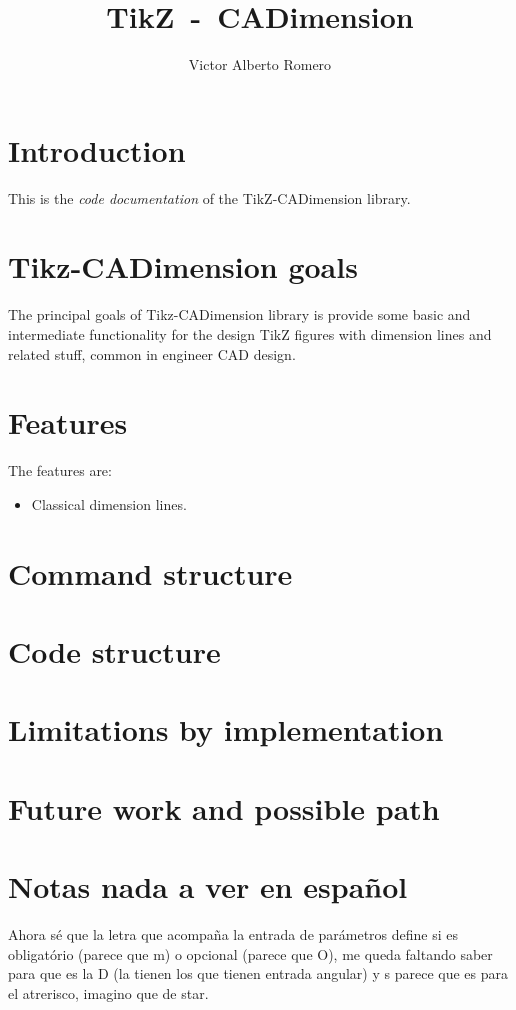 \documentclass[12pt]{article}
\begin{document}
\title{\textbf{TikZ~-~CADimension}}
\author{Victor Alberto Romero}
\maketitle

\section{Introduction}
This is the \emph{code documentation} of the TikZ-CADimension library.

\section{Tikz-CADimension goals}
The principal goals of Tikz-CADimension library is provide some basic and intermediate functionality for the design TikZ figures with dimension lines and related stuff, common in engineer CAD design.

\section{Features}
The features are:

\begin{itemize}
  \item Classical dimension lines.
\end{itemize}

\section{Command structure}

\section{Code structure}

\section{Limitations by implementation}

\section{Future work and possible path}

\section{Notas nada a ver en español}
Ahora sé que la letra que acompaña la entrada de parámetros define si es obligatório (parece que m) o opcional (parece que O), me queda faltando saber para que es la D (la tienen los que tienen entrada angular) y s parece que es para el atrerisco, imagino que de star.
\end{document}
